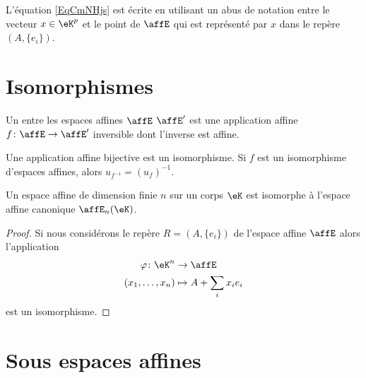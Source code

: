 \begin{remark}
    L'équation \eqref{EqCmNHjs} est écrite en utilisant un abus de notation entre le vecteur \( x\in \eK^p\) et le point de \( \affE\) qui est représenté par \( x\) dans le repère \( (A,\{ e_i \})\).    
\end{remark}

\section{Isomorphismes}

\begin{definition}
    Un  entre les espaces affines \( \affE\) \( \affE'\) est une application affine \( f\colon \affE\to \affE'\) inversible dont l'inverse est affine.
\end{definition}

\begin{proposition} \label{PropxtFeDE}
    Une application affine bijective est un isomorphisme. Si \( f\) est un isomorphisme d'espaces affines, alors \( u_{f^{-1}}=(u_f)^{-1}\).
\end{proposition}

\begin{proposition}
    Un espace affine de dimension finie \( n\) sur un corps \( \eK\) est isomorphe à l'espace affine canonique \( \affE_n(\eK)\).
\end{proposition}

\begin{proof}
    Si nous considérons le repère \( R=(A,\{ e_i \})\) de l'espace affine \( \affE\) alors l'application
    \begin{equation}
        \begin{aligned}
            \varphi\colon \eK^n&\to \affE \\
            (x_1,\ldots,x_n)&\mapsto A+\sum_ix_ie_i 
        \end{aligned}
    \end{equation}
    est un isomorphisme.
\end{proof}

\section{Sous espaces affines}

